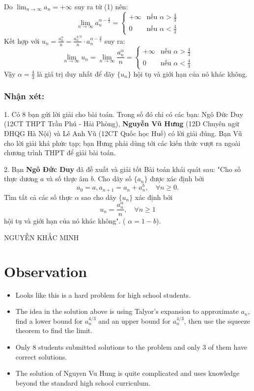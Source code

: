 \documentclass{article}
\begin{document}


Do $\lim_{n \to \infty} a_n = +\infty$ suy ra từ (1) nên:
$$ \lim_{n \to \infty} a_n^{\alpha - \frac{4}{3}} = \begin{cases} +\infty & \text{nếu } \alpha > \frac{4}{3} \\ 0 & \text{nếu } \alpha < \frac{4}{3} \end{cases} $$
Kết hợp với $u_n = \frac{a_n^\alpha}{n} = \frac{a_n^{4/3}}{n} \cdot a_n^{\alpha - \frac{4}{3}}$ suy ra:
$$ \lim_{n \to \infty} u_n = \lim_{n \to \infty} \frac{a_n^\alpha}{n} = \begin{cases} +\infty & \text{nếu } \alpha > \frac{4}{3} \\ 0 & \text{nếu } \alpha < \frac{4}{3} \end{cases} $$
Vậy $\alpha = \frac{4}{3}$ là giá trị duy nhất để dãy $\{u_n\}$ hội tụ và giới hạn của nó khác không.

\subsubsection*{Nhận xét:}
1. Có 8 bạn gửi lời giải cho bài toán. 
Trong số đó chỉ có các bạn: Ngô Đức Duy (12CT THPT Trần Phú - Hải Phòng), 
\textbf{Nguyễn Vũ Hưng} (12D Chuyên ngữ ĐHQG Hà Nội) và 
Lê Anh Vũ (12CT Quốc học Huế) có lời giải đúng. 
Bạn Vũ cho lời giải khá phức tạp; 
bạn Hưng phải dùng tới các kiến thức vượt ra ngoài chương trình THPT để giải bài toán.

2. Bạn \textbf{Ngô Đức Duy} đã đề xuất và giải tốt Bài toán khái quát sau: 
"Cho số thực dương $a$ và số thực âm $b$. Cho dãy số $\{a_n\}$ được xác định bởi
$$ a_0 = a, a_{n+1} = a_n + a_n^b, \quad \forall n \ge 0. $$
Tìm tất cả các số thực $\alpha$ sao cho dãy $\{u_n\}$ xác định bởi
$$ u_n = \frac{a_n^\alpha}{n}, \quad \forall n \ge 1 $$
hội tụ và giới hạn của nó khác không". ( $\alpha = 1 - b$).

\hfill NGUYỄN KHẮC MINH

\section{Observation}

\begin{itemize}
    \item Looks like this is a hard problem for high school students.
    \item The idea in the solution above is using Talyor's expansion to approximate $a_n$, find a lower bound for $a_n^{4/3}$ and an upper bound for $a_n^{4/3}$, then use the squeeze theorem to find the limit.
    \item Only 8 students submitted solutions to the problem and only 3 of them have correct solutions.
    \item The solution of Nguyen Vu Hung is quite complicated and uses knowledge beyond the standard high school curriculum. 
\end{itemize}
\end{document}
